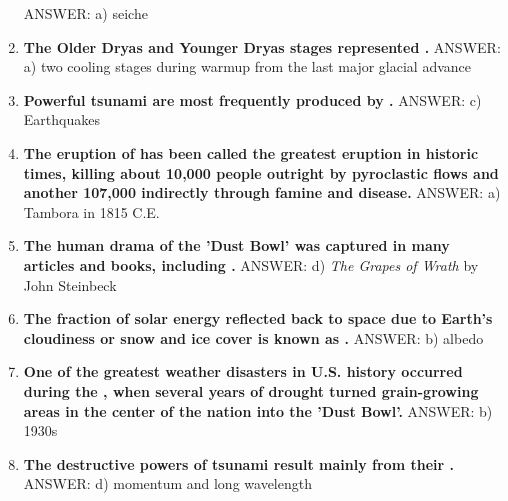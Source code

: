 \documentclass[10pt]{article}
\newcommand{\Rivpt}{\rule{.1pt}{1pt}}
\begin{document}
\begin{enumerate}
{\begin{samepage}
{}
ANSWER: a)	seiche
\end{samepage}
}
\item {
\setlength{\itemsep}{0cm}
\setlength{\parskip}{.2cm}
\begin{samepage}
\textbf{
The Older Dryas and Younger Dryas stages represented \makebox[1cm]{\Rivpt\hrulefill\Rivpt}.
}
ANSWER: a) two cooling stages during warmup from the last major glacial advance
\end{samepage}
}
\item {
\setlength{\itemsep}{0cm}
\setlength{\parskip}{.2cm}
\begin{samepage}
\textbf{
Powerful tsunami are most frequently produced by \makebox[1cm]{\Rivpt\hrulefill\Rivpt}.
}
ANSWER: c)	Earthquakes
\end{samepage}
}
\item {
\setlength{\itemsep}{0cm}
\setlength{\parskip}{.2cm}
\begin{samepage}
\textbf{
The eruption of \makebox[1cm]{\Rivpt\hrulefill\Rivpt} has been called the greatest eruption in historic times, killing about 10,000 people outright by pyroclastic flows and another 107,000 indirectly through famine and disease. 
}
ANSWER: a) Tambora in 1815 C.E.
\end{samepage}
}
\item {
\setlength{\itemsep}{0cm}
\setlength{\parskip}{.2cm}
\begin{samepage}
\textbf{
The human drama of the 'Dust Bowl' was captured in many articles and books, including \makebox[1cm]{\Rivpt\hrulefill\Rivpt}.
}
ANSWER: d) \emph{The Grapes of Wrath} by John Steinbeck 
\end{samepage}
}
\item {
\setlength{\itemsep}{0cm}
\setlength{\parskip}{.2cm}
\begin{samepage}
\textbf{
The fraction of solar energy reflected back to space due to Earth's cloudiness or snow and ice cover is known as \makebox[1cm]{\Rivpt\hrulefill\Rivpt}.
}
ANSWER: b) albedo
\end{samepage}
}
\item {
\setlength{\itemsep}{0cm}
\setlength{\parskip}{.2cm}
\begin{samepage}
\textbf{
One of the greatest weather disasters in U.S. history occurred during the \makebox[1cm]{\Rivpt\hrulefill\Rivpt}, when several years of drought turned grain-growing areas in the center of the nation into the 'Dust Bowl'. 
}
ANSWER: b) 1930s
\end{samepage}
}
\item {
\setlength{\itemsep}{0cm}
\setlength{\parskip}{.2cm}
\begin{samepage}
\textbf{
The destructive powers of tsunami result mainly from their \makebox[1cm]{\Rivpt\hrulefill\Rivpt}.
}
ANSWER: d)	momentum and long wavelength
\end{samepage}
}
\end{enumerate}
\end{document}
